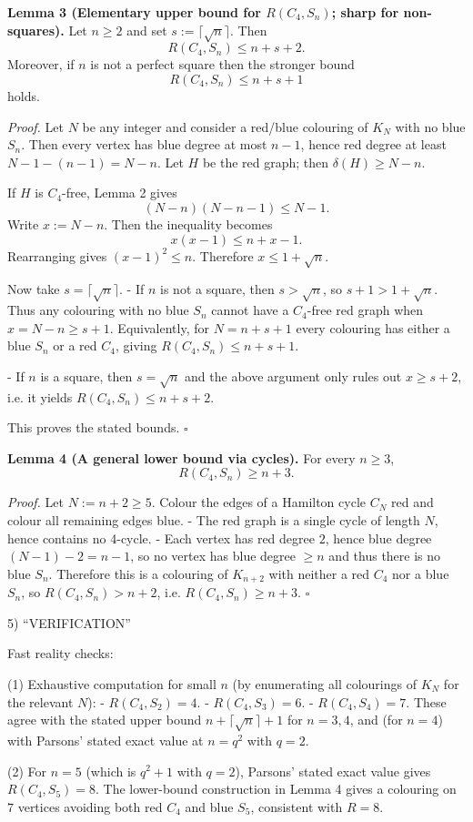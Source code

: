 \textbf{Lemma 3 (Elementary upper bound for $R(C_4,S_n)$; sharp for non-squares).}
Let $n\ge 2$ and set $s:=\lceil\sqrt{n}\rceil$. Then
\[
R(C_4,S_n)\le n+s+2.
\]
Moreover, if $n$ is not a perfect square then the stronger bound
\[
R(C_4,S_n)\le n+s+1
\]
holds.

\emph{Proof.}
Let $N$ be any integer and consider a red/blue colouring of $K_N$ with no blue $S_n$. Then every vertex has blue degree at most $n-1$, hence red degree at least $N-1-(n-1)=N-n$. Let $H$ be the red graph; then $\delta(H)\ge N-n$.

If $H$ is $C_4$-free, Lemma 2 gives
\[
(N-n)(N-n-1) \le N-1.
\]
Write $x:=N-n$. Then the inequality becomes
\[
x(x-1) \le n+x-1.
\]
Rearranging gives $(x-1)^2\le n$. Therefore $x\le 1+\sqrt{n}$.

Now take $s=\lceil\sqrt{n}\rceil$.
- If $n$ is not a square, then $s>\sqrt{n}$, so $s+1>1+\sqrt{n}$. Thus any colouring with no blue $S_n$ cannot have a $C_4$-free red graph when $x=N-n\ge s+1$. Equivalently, for $N=n+s+1$ every colouring has either a blue $S_n$ or a red $C_4$, giving $R(C_4,S_n)\le n+s+1$.

- If $n$ is a square, then $s=\sqrt n$ and the above argument only rules out $x\ge s+2$, i.e. it yields $R(C_4,S_n)\le n+s+2$.

This proves the stated bounds. $\square$

\textbf{Lemma 4 (A general lower bound via cycles).}
For every $n\ge 3$,
\[
R(C_4,S_n)\ge n+3.
\]

\emph{Proof.}
Let $N:=n+2\ge 5$. Colour the edges of a Hamilton cycle $C_N$ red and colour all remaining edges blue.
- The red graph is a single cycle of length $N$, hence contains no 4-cycle.
- Each vertex has red degree $2$, hence blue degree $(N-1)-2 = n-1$, so no vertex has blue degree $\ge n$ and thus there is no blue $S_n$.
Therefore this is a colouring of $K_{n+2}$ with neither a red $C_4$ nor a blue $S_n$, so $R(C_4,S_n)>n+2$, i.e. $R(C_4,S_n)\ge n+3$. $\square$

5) “VERIFICATION”

Fast reality checks:

(1) Exhaustive computation for small $n$ (by enumerating all colourings of $K_N$ for the relevant $N$):
- $R(C_4,S_2)=4$.
- $R(C_4,S_3)=6$.
- $R(C_4,S_4)=7$.
These agree with the stated upper bound $n+\lceil\sqrt n\rceil+1$ for $n=3,4$, and (for $n=4$) with Parsons' stated exact value at $n=q^2$ with $q=2$.

(2) For $n=5$ (which is $q^2+1$ with $q=2$), Parsons' stated exact value gives $R(C_4,S_5)=8$. The lower-bound construction in Lemma 4 gives a colouring on $7$ vertices avoiding both red $C_4$ and blue $S_5$, consistent with $R=8$.

